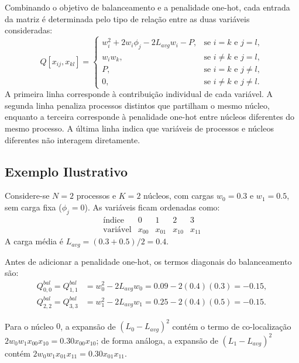 \documentclass[12pt,a4paper]{article}
\begin{document}
Combinando o objetivo de balanceamento e a penalidade one-hot, cada entrada da matriz
é determinada pelo tipo de relação entre as duas variáveis consideradas:
\begin{equation}
Q[x_{ij},x_{kl}] =
\begin{cases}
w_i^2 + 2w_i\phi_j - 2L_{avg}w_i - P, & \text{se } i=k \text{ e } j=l,\\
w_iw_k, & \text{se } i \neq k \text{ e } j=l,\\
P, & \text{se } i=k \text{ e } j \neq l,\\
0, & \text{se } i \neq k \text{ e } j \neq l.
\end{cases}
\end{equation}
A primeira linha corresponde à contribuição individual de cada variável. A segunda
linha penaliza processos distintos que partilham o mesmo núcleo, enquanto a terceira
corresponde à penalidade one-hot entre núcleos diferentes do mesmo processo. A última
linha indica que variáveis de processos e núcleos diferentes não interagem diretamente.

\subsection{Exemplo Ilustrativo}

Considere-se $N=2$ processos e $K=2$ núcleos, com cargas $w_0=0.3$ e $w_1=0.5$,
sem carga fixa ($\phi_j=0$). As variáveis ficam ordenadas como:
\begin{equation}
\begin{array}{c|cccc}
\text{índice} & 0 & 1 & 2 & 3 \\
\hline
\text{variável} & x_{00} & x_{01} & x_{10} & x_{11}
\end{array}
\end{equation}
A carga média é $L_{avg}=(0.3+0.5)/2=0.4$.

Antes de adicionar a penalidade one-hot, os termos diagonais do balanceamento são:
\begin{align}
Q_{0,0}^{bal}=Q_{1,1}^{bal}
&= w_0^2 - 2L_{avg}w_0
= 0.09 - 2(0.4)(0.3)
= -0.15,\\
Q_{2,2}^{bal}=Q_{3,3}^{bal}
&= w_1^2 - 2L_{avg}w_1
= 0.25 - 2(0.4)(0.5)
= -0.15.
\end{align}

Para o núcleo $0$, a expansão de $(L_0 - L_{avg})^2$ contém o termo de
co-localização $2w_0w_1x_{00}x_{10}=0.30x_{00}x_{10}$; de forma análoga, a expansão de $(L_1 - L_{avg})^2$ contém
$2w_0w_1x_{01}x_{11}=0.30x_{01}x_{11}$.
\end{document}
